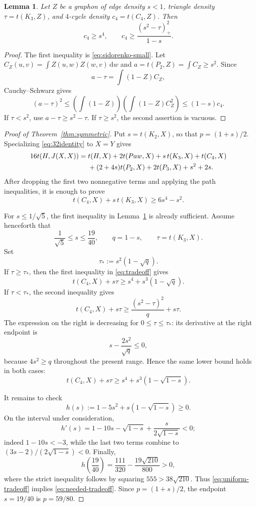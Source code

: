 \documentclass[11pt]{article}
\newtheorem{lemma}[theorem]{Lemma}
\newcommand{\dd}{\,\mathrm d}
\begin{document}
\begin{lemma}\label{lem:tradeoff}
Let \(Z\) be a graphon of edge density \(s<1\), triangle density
\(\tau=t(K_3,Z)\), and \(4\)-cycle density \(c_4=t(C_4,Z)\).  Then
\begin{equation}\label{eq:tradeoff}
 c_4\geq s^4,
 \qquad
 c_4\geq\frac{(s^2-\tau)_+^2}{1-s}.
\end{equation}
\end{lemma}

\begin{proof}
The first inequality is \eqref{eq:sidorenko-small}.  Let
\(C_Z(u,v)=\int Z(u,w)Z(w,v)\dd w\) and
\(a=t(P_2,Z)=\int C_Z\geq s^2\).  Since
\[
 a-\tau=\int(1-Z)C_Z,
\]
Cauchy--Schwarz gives
\[
 (a-\tau)^2
 \leq\left(\int(1-Z)\right)
       \left(\int(1-Z)C_Z^2\right)
 \leq(1-s)c_4.
\]
If \(\tau<s^2\), use \(a-\tau\geq s^2-\tau\).  If
\(\tau\geq s^2\), the second assertion is vacuous.
\end{proof}

\begin{proof}[Proof of Theorem~\ref{thm:symmetric}]
Put \(s=t(K_2,X)\), so that \(p=(1+s)/2\).  Specializing
\eqref{eq:32identity} to \(X=Y\) gives
\begin{align}
16t(H,J(X,X))={}&t(H,X)+2t(Paw,X)+s\,t(K_3,X)+t(C_4,X)\notag\\
&+(2+4s)t(P_2,X)+2t(P_3,X)+s^2+2s.
\label{eq:symmetric-identity}
\end{align}
After dropping the first two nonnegative terms and applying the path
inequalities, it is enough to prove
\begin{equation}\label{eq:needed-tradeoff}
 t(C_4,X)+s\,t(K_3,X)\geq 6s^4-s^2.
\end{equation}

For \(s\leq1/\sqrt5\), the first inequality in
Lemma~\ref{lem:tradeoff} is already sufficient.  Assume henceforth that
\[
 \frac1{\sqrt5}\leq s\leq\frac{19}{40},
 \qquad q=1-s,
 \qquad \tau=t(K_3,X).
\]
Set
\[
 \tau_*:=s^2(1-\sqrt q).
\]
If \(\tau\geq\tau_*\), then the first inequality in
\eqref{eq:tradeoff} gives
\[
 t(C_4,X)+s\tau
 \geq s^4+s^3(1-\sqrt q).
\]
If \(\tau<\tau_*\), the second inequality gives
\[
 t(C_4,X)+s\tau
 \geq \frac{(s^2-\tau)^2}{q}+s\tau.
\]
The expression on the right is decreasing for
\(0\leq\tau\leq\tau_*\): its derivative at the right endpoint is
\[
 s-\frac{2s^2}{\sqrt q}\leq0,
\]
because \(4s^2\geq q\) throughout the present range.  Hence the same lower
bound holds in both cases:
\begin{equation}\label{eq:uniform-tradeoff}
 t(C_4,X)+s\tau
 \geq s^4+s^3(1-\sqrt{1-s}).
\end{equation}

It remains to check
\[
 h(s):=1-5s^2+s(1-\sqrt{1-s})\geq0.
\]
On the interval under consideration,
\[
 h'(s)=1-10s-\sqrt{1-s}+\frac{s}{2\sqrt{1-s}}<0;
\]
indeed \(1-10s<-3\), while the last two terms combine to
\((3s-2)/(2\sqrt{1-s})<0\).  Finally,
\[
 h\left(\frac{19}{40}\right)
 =\frac{111}{320}-\frac{19\sqrt{210}}{800}>0,
\]
where the strict inequality follows by squaring
\(555>38\sqrt{210}\).  Thus \eqref{eq:uniform-tradeoff} implies
\eqref{eq:needed-tradeoff}.  Since \(p=(1+s)/2\), the endpoint
\(s=19/40\) is \(p=59/80\).
\end{proof}
\end{document}
